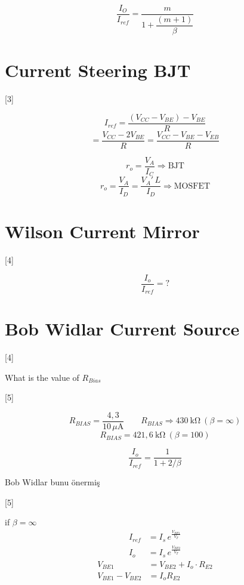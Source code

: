\documentclass[11pt,a4paper]{article}
\begin{document}
\[ \frac{I_O}{I_{ref}} = \frac{m}{1+\dfrac{(m+1)}{\beta}} \]

\section{Current Steering BJT}

[3]

\[ I_{ref} = \frac{(V_{CC}-V_{BE})-V_{BE}}{R} \]
\[ = \frac{V_{CC}-2V_{BE}}{R} = \frac{V_{CC}-V_{BE}-V_{EB}}{R} \]


\[ r_o = \frac{V_A}{I_C} \Rightarrow \text{BJT} \]
\[ r_o = \frac{V_A}{I_D} = \frac{V_A'\,L}{I_D} \Rightarrow \text{MOSFET} \]

\section{Wilson Current Mirror}

[4]

\[ \frac{I_o}{I_{ref}} = ? \]

\section{Bob Widlar Current Source}

[4]

What is the value of $R_{Bias}$

[5]

\[ R_{BIAS} = \frac{4{,}3}{10\,\mu\mathrm{A}} \qquad R_{BIAS} \Rightarrow 430\ \mathrm{k\Omega}\ (\beta=\infty) \]
\[ R_{BIAS} = 421{,}6\ \mathrm{k\Omega}\ (\beta=100) \]

\[ \frac{I_o}{I_{ref}} = \frac{1}{1+2/\beta} \]

Bob Widlar bunu önermiş

[5]

if $\beta=\infty$
\begin{align*}
I_{ref} &= I_s\,e^{\frac{V_{BE1}}{V_T}} \\
I_o &= I_s\,e^{\frac{V_{BE2}}{V_T}}
\end{align*}
\begin{align*}
V_{BE1} &= V_{BE2} + I_o\cdot R_{E2} \\
V_{BE1} - V_{BE2} &= I_o R_{E2}
\end{align*}
\end{document}
